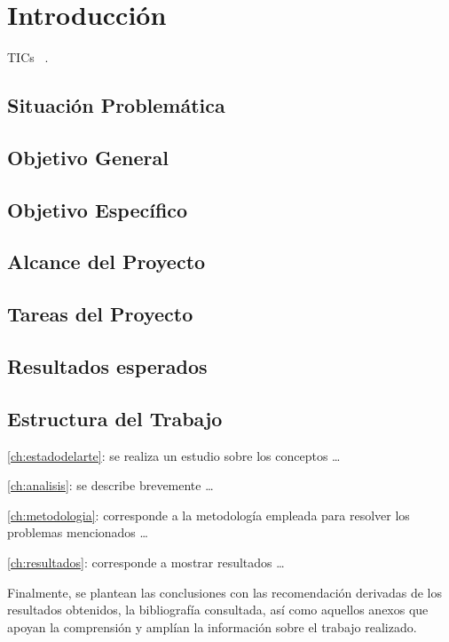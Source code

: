 \chapter{Introducción}\label{ch:introduccion}

\lipsum[1-2] \ac{TICs}
\lipsum[2-4]~\cite{Castellanos14}.
\lipsum[1-4]

\section{Situación Problemática}\label{sec:situacion}
\lipsum[1]

\section{Objetivo General}\label{sec:objetivog}
\lipsum[1]

\section{Objetivo Específico}\label{sec:objetivoe}
\lipsum[1]

\section{Alcance del Proyecto}\label{sec:alcancea}
\lipsum[1]

\section{Tareas del Proyecto}\label{sec:tarea}
\lipsum[1]

\section{Resultados esperados}\label{sec:resultado}
\lipsum[1]

\section{Estructura del Trabajo}\label{sec:estructura}
\lipsum[1]

\autoref{ch:estadodelarte}: se realiza un estudio sobre los conceptos \ldots

\autoref{ch:analisis}: se describe brevemente \ldots

\autoref{ch:metodologia}: corresponde a la metodología empleada para resolver los problemas mencionados \ldots

\autoref{ch:resultados}: corresponde a mostrar resultados \ldots

Finalmente, se plantean las conclusiones con las recomendación derivadas de los resultados obtenidos, la bibliografía consultada, así como aquellos anexos que apoyan la comprensión y amplían la información sobre el trabajo realizado.